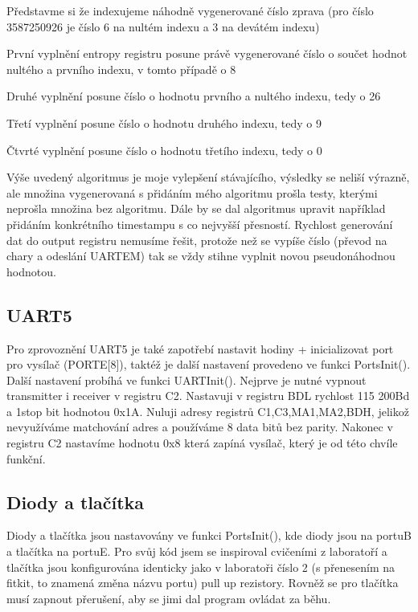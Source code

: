 \documentclass[a4paper]{article}
\begin{document}
Představme si že indexujeme náhodně vygenerované číslo zprava (pro číslo 3587250926 je číslo 6 na nultém indexu a 3 na devátém indexu)

První vyplnění entropy registru posune právě vygenerované číslo o součet hodnot nultého a prvního indexu, v tomto případě o 8

Druhé vyplnění posune číslo o hodnotu prvního a nultého indexu, tedy o 26

Třetí vyplnění posune číslo o hodnotu druhého indexu, tedy o 9

Čtvrté vyplnění posune číslo o hodnotu třetího indexu, tedy o 0

\noindent Výše uvedený algoritmus je moje vylepšení stávajícího, výsledky se neliší výrazně, ale množina vygenerovaná s přidáním mého algoritmu prošla testy, kterými neprošla množina bez algoritmu. Dále by se dal algoritmus upravit například přidáním konkrétního timestampu s co nejvyšší přesností. Rychlost generování dat do output registru nemusíme řešit, protože než se vypíše číslo (převod na chary a odeslání UARTEM) tak se vždy stihne vyplnit novou pseudonáhodnou hodnotou.


\subsection{UART5}
Pro zprovoznění UART5 je také zapotřebí nastavit hodiny + inicializovat port pro vysílač (PORTE[8]), taktéž je další nastavení provedeno ve funkci PortsInit(). Další nastavení probíhá ve funkci UARTInit(). Nejprve je nutné vypnout transmitter i receiver v registru C2. Nastavuji v registru BDL rychlost 115 200Bd a 1stop bit hodnotou 0x1A. Nuluji adresy registrů C1,C3,MA1,MA2,BDH, jelikož nevyužíváme matchování adres a používáme 8 data bitů bez parity. Nakonec v registru C2 nastavíme hodnotu 0x8 která zapíná vysílač, který je od této chvíle funkční.




\subsection{Diody a tlačítka}
Diody a tlačítka jsou nastavovány ve funkci PortsInit(), kde diody jsou na portuB a tlačítka na portuE. Pro svůj kód jsem se inspiroval cvičeními z laboratoří a tlačítka jsou konfigurována identicky jako v laboratoři číslo 2 (s přenesením na fitkit, to znamená změna názvu portu) pull up rezistory. Rovněž se pro tlačítka musí zapnout přerušení, aby se jimi dal program ovládat za běhu.
\end{document}
